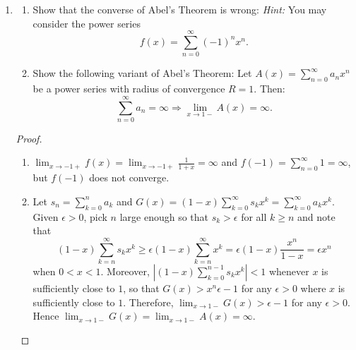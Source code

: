 \documentclass{article}
\begin{document}
\begin{enumerate}[font = \Large\bfseries\itshape\space, leftmargin = 3mm, labelsep = 3mm]
\begin{proof}
\textit{Claim:} For $n$ there exists polynomial $p_n$ such that $f^{(n)}(x) = p_n(\frac{1}{x}) e^{-\frac{1}{x^2}}$ if $x \neq 0$, and $f^{(n)}(x) = 0$ if $x = 0$.\\
First, the claim is true for $n = 0$.
If the claim is true for some $n$, i.e. $f^{(n)}(x) = p_n(\frac{1}{x}) e^{-\frac{1}{x^2}}$, then
$f^{(n+1)}(x) = \frac{2}{x^3}p_n(\frac{1}{x}) - \frac{1}{x^2}p_n(\frac{1}{x}) e^{-\frac{1}{x^2}} = p_{n+1}(x) e^{-\frac{1}{x^2}}$ for $x \neq 0$.
By lemma, $\lim_{x\rightarrow 0}f^{(n+1)}(x) = 0$.
Moreover, $f^{(n+1)}(0) = \lim_{x\rightarrow 0} \frac{f^{(n)}(x) - f^{(n)}(0)}{x - 0} = \lim_{x\rightarrow 0} \frac{f^{(n)}(x)}{x} = \lim_{x\rightarrow 0} \frac{p_n(\frac{1}{x})}{x} e^{-\frac{1}{x^2}} = 0$ by lemma.
Therefore, $f^{(n+1)}$ is continuous.
By induction hypothesis, $f \in C^\infty (\mathbb{R})$ and $f^{(n)}(0) = 0$ for any $n \geq 0$.
\end{proof}

\item
\begin{enumerate}[label=(\roman*)]
\item Show that the converse of Abel's Theorem is wrong:
\textit{Hint:} You may consider the power series
$$
f(x) = \sum_{n=0}^\infty (-1)^n x^n.
$$

\item
Show the following variant of Abel's Theorem:
Let $A(x) = \sum_{n=0}^\infty a_nx^n$ be a power series with radius of convergence $R = 1$.
Then:
$$
\sum_{n=0}^\infty a_n = \infty \Rightarrow \lim_{x\rightarrow 1-} A(x) = \infty.
$$
\end{enumerate}

\begin{proof}
\leavevmode
\begin{enumerate}[label = (\roman*)]
\item
$\lim_{x \rightarrow -1+} f(x) = \lim_{x\rightarrow -1+} \frac{1}{1+x} = \infty$ and $f(-1) = \sum_{n=0}^\infty 1 = \infty$,
but $f(-1)$ does not converge.

\item
Let $s_n = \sum_{k=0}^n a_k$ and $G(x) = (1-x) \sum_{k=0}^\infty s_k x^k = \sum_{k=0}^\infty a_k x^k$.
Given $\epsilon > 0$, pick $n$ large enough so that $s_k > \epsilon$ for all $k \geq n$ and note that
$$ (1-x) \sum_{k=n}^\infty s_k x^k \geq \epsilon (1-x)\sum_{k=n}^\infty x^k = \epsilon (1-x) \frac{x^n}{1-x} = \epsilon x^n$$
when $0 < x < 1$.
Moreover, $|(1-x)\sum_{k=0}^{n-1} s_kx^k| < 1$ whenever $x$ is sufficiently close to $1$,
so that $G(x) > x^n\epsilon - 1$ for any $\epsilon > 0$ where $x$ is sufficiently close to $1$.
Therefore, $\lim_{x\rightarrow 1-} G(x) > \epsilon - 1$ for any $\epsilon > 0$.
Hence $\lim_{x\rightarrow 1-}G(x) = \lim_{x\rightarrow 1-}A(x) = \infty$.



\end{enumerate}
\end{proof}
\end{enumerate}
\end{document}
